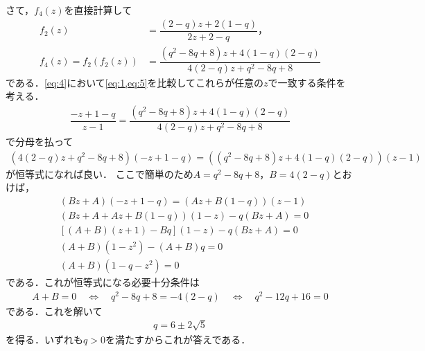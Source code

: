 \documentclass[../../main.tex]{subfiles}
\begin{document}
さて，$f_4(z)$を直接計算して
\begin{align}
  f_2(z)&=\dfrac{(2-q)z+2(1-q)}{2z+2-q}，\\
  f_4(z)=f_2(f_2(z))
  &=\dfrac{(q^2-8q+8)z+4(1-q)(2-q)}{4(2-q)z+q^2-8q+8} \label{eq:5}
\end{align}
である．\cref{eq:4}において\cref{eq:1,eq:5}を比較してこれらが任意の$z$で一致する条件を考える．
\begin{align}
  \dfrac{-z+1-q}{z-1} = \dfrac{(q^2-8q+8)z+4(1-q)(2-q)}{4(2-q)z+q^2-8q+8}
\end{align}
で分母を払って
\begin{align}
  \left(4(2-q)z+q^2-8q+8\right)\left(-z+1-q\right) = \left((q^2-8q+8)z+4(1-q)(2-q)\right)\left(z-1\right)
\end{align}
が恒等式になれば良い．
ここで簡単のため$A=q^2-8q+8$，$B=4(2-q)$とおけば，
\begin{align}
  & \left(Bz+A\right)\left(-z+1-q\right) = \left(Az+B(1-q)\right)\left(z-1\right) \\
  & \left(Bz+A+Az+B(1-q)\right)(1-z) - q\left(Bz+A\right) = 0 \\
  & \left[(A+B)(z+1) -Bq\right](1-z) - q\left(Bz+A\right) = 0 \\
  & (A+B)(1-z^2) -(A+B)q = 0 \\
  & (A+B)(1-q-z^2) = 0
\end{align}
である．これが恒等式になる必要十分条件は
\begin{align}
  A+B=0
  \quad\Longleftrightarrow\quad
  q^2-8q+8=-4(2-q)
  \quad\Longleftrightarrow\quad
  q^2-12q+16=0
\end{align}
である．これを解いて
\begin{align}
  q=6\pm2\sqrt{5}
\end{align}
を得る．いずれも$q>0$を満たすからこれが答えである．
\end{document}
